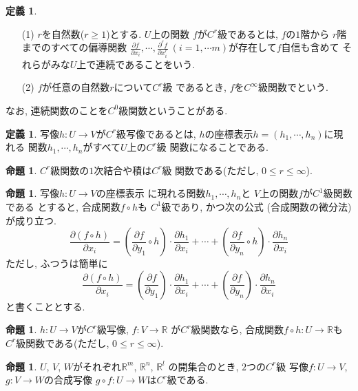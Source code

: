 \documentclass[a4j,12pt]{jarticle}
\theoremstyle{definition}
\newtheorem{definition}[theorem]{定義}
\newtheorem{proposition}[theorem]{命題}
\begin{document}
\begin{definition}
    \begin{itemize}
        \item[(1)]
        $r$を自然数($r\geq 1$)とする. $U$上の関数
        $f$が$C^r$級であるとは, $f$の$1$階から
        $r$階までのすべての偏導関数
        $\frac{\partial f}{\partial x_i},\cdots ,
        \frac{\partial^rf}{\partial x_i^r}\ 
        (i=1,\cdots m)$が存在して$f$自信も含めて
        それらがみな$U$上で連続であることをいう. 
        \item[(2)]
        $f$が任意の自然数$r$について$C^r$級
        であるとき, $f$を$C^\infty$級関数でという. 
    \end{itemize}
    なお, 連続関数のことを$C^0$級関数ということがある. 
\end{definition}
\begin{definition}\label{def:C^r map}
    写像$h:U\to V$が$C^r$級写像であるとは, 
    $h$の座標表示$h=(h_1,\cdots ,h_n)$に現れる
    関数$h_1,\cdots ,h_n$がすべて$U$上の$C^r$級
    関数になることである. 
\end{definition}
\begin{proposition}
    $C^r$級関数の$1$次結合や積は$C^r$級
    関数である(ただし, $0\leq r\leq \infty$). 
\end{proposition}
\begin{proposition}
    写像$h:U\to V$の座標表示
    に現れる関数$h_1,\cdots ,h_n$と
    $V$上の関数$f$が$C^1$級関数である
    とすると, 合成関数$f\circ h$も
    $C^1$級であり, かつ次の公式
    (合成関数の微分法)が成り立つ. 
    $$\frac{\partial (f\circ h)}{\partial x_i}=
    \left(\frac{\partial f}{\partial y_1}
    \circ h\right)\cdot \frac{\partial h_1}
    {\partial x_i}+\cdots +
    \left(\frac{\partial f}{\partial y_n}
    \circ h\right)\cdot \frac{\partial h_n}
    {\partial x_i}$$
    ただし, ふつうは簡単に
    $$\frac{\partial (f\circ h)}{\partial x_i}=
    \left(\frac{\partial f}{\partial y_1}
    \right)\cdot \frac{\partial h_1}
    {\partial x_i}+\cdots +
    \left(\frac{\partial f}{\partial y_n}
    \right)\cdot \frac{\partial h_n}
    {\partial x_i}$$
    と書くこととする. 
\end{proposition}
\begin{proposition}
    $h:U\to V$が$C^r$級写像, $f:V\to \mathbb{R}$
    が$C^r$級関数なら, 合成関数$f\circ h:U\to 
    \mathbb{R}$も$C^r$級関数である(ただし, 
    $0\leq r\leq \infty$). 
\end{proposition}
\begin{proposition}
    $U$, $V$, $W$がそれぞれ$\mathbb{R}^m$, 
    $\mathbb{R}^n$, $\mathbb{R}^l$
    の開集合のとき, $2$つの$C^r$級
    写像$f:U\to V$, $g:V\to W$の合成写像
    $g\circ f:U\to W$は$C^r$級である. 
\end{proposition}
\end{document}
